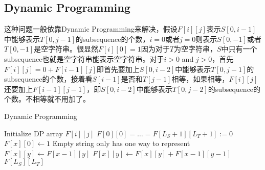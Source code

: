 \subsection{Dynamic Programming}
\begin{CJK*}{UTF8}{gbsn}
这种问题一般依靠Dynamic Programming来解决，假设$F[i][j]$表示$S[0,i-1]$中能够表示$T[0,j-1]$的subsequence的个数，$i=0$或者$j=0$则表示$S[0,-1]$或者$T[0,-1]$是空字符串。很显然$F[i][0]=1$因为对于$T$为空字符串，$S$中只有一个subsequence也就是空字符串能表示空字符串。对于$i>0$ and $j>0$，首先$F[i][j] = 0 + F[i-1][j]$即首先要加上$S[0,i-2]$中能够表示$T[0,j-1]$的subsequence的个数，接着看$S[i-1]$是否和$T[j-1]$相等，如果相等，$F[i][j]$还要加上$F[i-1][j-1]$，即$S[0,i-2]$中能够表示$T[0,j-2]$的subsequence的个数。不相等就不用加了。
\end{CJK*}
\setcounter{algorithm}{0}
\begin{algorithm}[H]
\caption{Dynamic Programming}
\begin{algorithmic}[1]
\State Initialize DP array $F[i][j]$
\State $F[0][0]=\ldots=F[L_S+1][L_T+1]:=0$
\State $F[x][0]\gets 1$ \Comment Empty string only has one way to represent
\EndFor
{}
\State $F[x][y]\gets F[x-1][y]$ 
\State $F[x][y]\gets F[x][y] + F[x-1][y-1]$
\EndIf
\EndFor
\EndFor
\State \Return $F[L_S][L_T]$
\EndProcedure
\end{algorithmic}
\end{algorithm}

